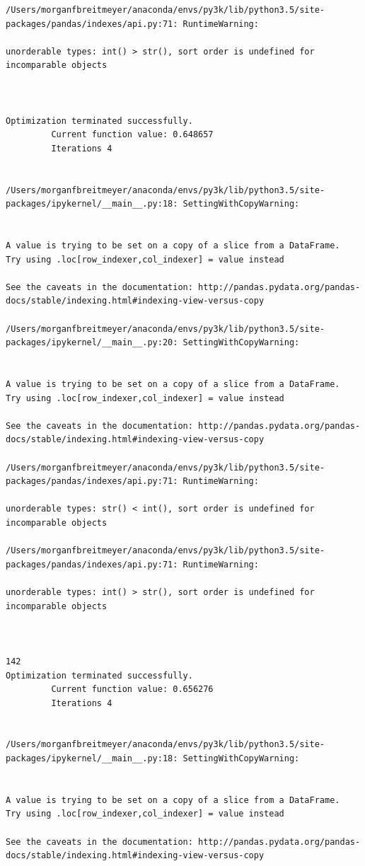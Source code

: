 \begin{lstlisting}
/Users/morganfbreitmeyer/anaconda/envs/py3k/lib/python3.5/site-packages/pandas/indexes/api.py:71: RuntimeWarning:

unorderable types: int() > str(), sort order is undefined for incomparable objects



Optimization terminated successfully.
         Current function value: 0.648657
         Iterations 4


/Users/morganfbreitmeyer/anaconda/envs/py3k/lib/python3.5/site-packages/ipykernel/__main__.py:18: SettingWithCopyWarning:


A value is trying to be set on a copy of a slice from a DataFrame.
Try using .loc[row_indexer,col_indexer] = value instead

See the caveats in the documentation: http://pandas.pydata.org/pandas-docs/stable/indexing.html#indexing-view-versus-copy

/Users/morganfbreitmeyer/anaconda/envs/py3k/lib/python3.5/site-packages/ipykernel/__main__.py:20: SettingWithCopyWarning:


A value is trying to be set on a copy of a slice from a DataFrame.
Try using .loc[row_indexer,col_indexer] = value instead

See the caveats in the documentation: http://pandas.pydata.org/pandas-docs/stable/indexing.html#indexing-view-versus-copy

/Users/morganfbreitmeyer/anaconda/envs/py3k/lib/python3.5/site-packages/pandas/indexes/api.py:71: RuntimeWarning:

unorderable types: str() < int(), sort order is undefined for incomparable objects

/Users/morganfbreitmeyer/anaconda/envs/py3k/lib/python3.5/site-packages/pandas/indexes/api.py:71: RuntimeWarning:

unorderable types: int() > str(), sort order is undefined for incomparable objects



142
Optimization terminated successfully.
         Current function value: 0.656276
         Iterations 4


/Users/morganfbreitmeyer/anaconda/envs/py3k/lib/python3.5/site-packages/ipykernel/__main__.py:18: SettingWithCopyWarning:


A value is trying to be set on a copy of a slice from a DataFrame.
Try using .loc[row_indexer,col_indexer] = value instead

See the caveats in the documentation: http://pandas.pydata.org/pandas-docs/stable/indexing.html#indexing-view-versus-copy


\end{lstlisting}
